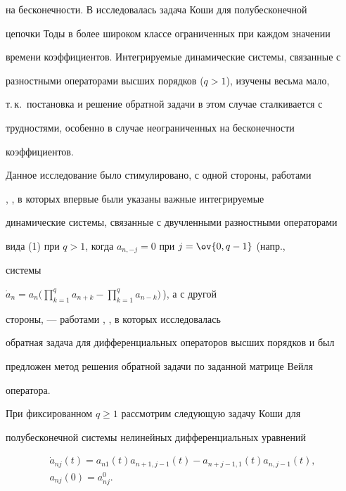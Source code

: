 на бесконечности. В \cite{6} исследовалась задача Коши для полубесконечной 


цепочки Тоды в более широком классе ограниченных при каждом значении 


времени коэффициентов. Интегрируемые динамические системы, связанные с 


разностными операторами высших порядков ($q>1$), изучены весьма мало,


т.\,к.~постановка и решение обратной задачи в этом случае сталкивается с 


трудностями, особенно в случае неограниченных на бесконечности 


коэффициентов. 


 


Данное исследование было стимулировано, с одной стороны, работами 


\cite{7}, \cite{8}, в которых впервые были указаны важные интегрируемые 


динамические системы, связанные с двучленными разностными операторами 


вида (1) при $q>1$, когда $a_{n,-j}=0$ при $j=\ov{0,q-1}$ (напр., 


системы 


$\Dot a_n=a_n\big(\prod\limits^q_{k=1}a_{n+k}- 


\prod\limits^q_{k=1}a_{n-k}\big)$\,), а с другой 


стороны, --- работами \cite{9}, \cite{10}, в которых исследовалась 


обратная задача для дифференциальных операторов высших порядков и был 


предложен метод решения обратной задачи по заданной матрице Вейля 


оператора. 


 


При фиксированном $q\ge 1$ рассмотрим следующую задачу Коши для 


полубесконечной системы нелинейных дифференциальных уравнений 


\begin{gather} 


\Dot a_{nj}(t)=a_{n1}(t)a_{n+1,j-1}(t)- 


a_{n+j-1,1}(t)a_{n,j-1}(t), \\ 


a_{nj}(0)=a^0_{nj}. 


\end{gather} 



